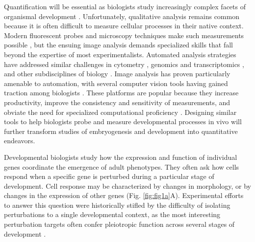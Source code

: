 Quantification will be essential as biologists study increasingly complex facets of organismal development \cite{Oates2009}. Unfortunately, qualitative analysis remains common because it is often difficult to measure cellular processes in their native context. Modern fluorescent probes and microscopy techniques make such measurements possible \cite{Muzzey2009a,Stelzer2014,Truong2011}, but the ensuing image analysis demands specialized skills that fall beyond the expertise of most experimentalists. Automated analysis strategies have addressed similar challenges in cytometry \cite{Aghaeepour2013,Chen2015,Pyne2009}, genomics and transcriptomics \cite{Bernstein2008,Hellemans2007,Langmead2012,Trapnell2009}, and other subdisciplines of biology \cite{Costes2004,Kelley2015}. Image analysis has proven particularly amenable to automation, with several computer vision tools having gained traction among biologists \cite{Carpenter2006,Paintdakhi2016,Schindelin2012,Sommer2011}. These platforms are popular because they increase productivity, improve the consistency and sensitivity of measurements, and obviate the need for specialized computational proficiency \cite{Jug2014,Sbalzarini2016,Schindelin2015}. Designing similar tools to help biologists probe and measure developmental processes in vivo will further transform studies of embryogenesis and development into quantitative endeavors.

Developmental biologists study how the expression and function of individual genes coordinate the emergence of adult phenotypes. They often ask how cells respond when a specific gene is perturbed during a particular stage of development. Cell response may be characterized by changes in morphology, or by changes in the expression of other genes (Fig. \ref{fig:fig1a}A). Experimental efforts to answer this question were historically stifled by the difficulty of isolating perturbations to a single developmental context, as the most interesting perturbation targets often confer pleiotropic function across several stages of development \cite{IanSimpson2002,Parody1993,Shilo1991}. 

